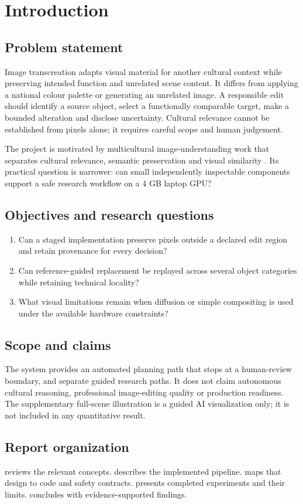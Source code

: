 \chapter{Introduction}
\label{ch:introduction}
\section{Problem statement}
Image transcreation adapts visual material for another cultural context while preserving intended function and unrelated scene content. It differs from applying a national colour palette or generating an unrelated image. A responsible edit should identify a source object, select a functionally comparable target, make a bounded alteration and disclose uncertainty. Cultural relevance cannot be established from pixels alone; it requires careful scope and human judgement.

The project is motivated by multicultural image-understanding work that separates cultural relevance, semantic preservation and visual similarity \cite{khanuja2024image,khanuja2025evaluating}. Its practical question is narrower: can small independently inspectable components support a safe research workflow on a 4 GB laptop GPU?

\section{Objectives and research questions}
\begin{enumerate}[label=\textbf{RQ\arabic*:},leftmargin=*]
\item Can a staged implementation preserve pixels outside a declared edit region and retain provenance for every decision?
\item Can reference-guided replacement be replayed across several object categories while retaining technical locality?
\item What visual limitations remain when diffusion or simple compositing is used under the available hardware constraints?
\end{enumerate}

\section{Scope and claims}
The system provides an automated planning path that stops at a human-review boundary, and separate guided research paths. It does not claim autonomous cultural reasoning, professional image-editing quality or production readiness. The supplementary full-scene illustration is a guided AI visualization only; it is not included in any quantitative result.

\section{Report organization}
 reviews the relevant concepts.  describes the implemented pipeline.  maps that design to code and safety contracts.  presents completed experiments and their limits.  concludes with evidence-supported findings.
